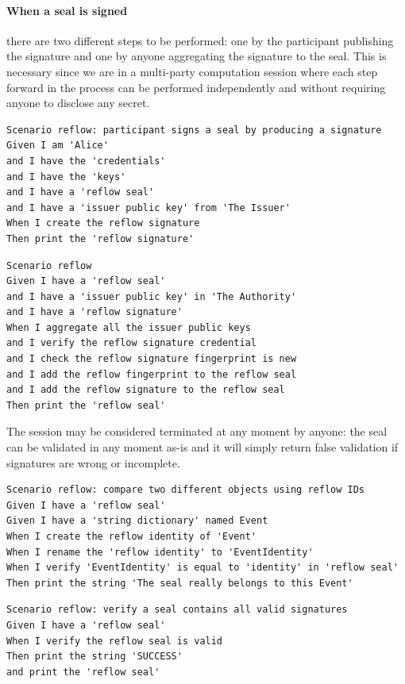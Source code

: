 \documentclass[twocolumn]{article}
\begin{document}
\paragraph{When a seal is signed} there are two different steps to be
performed: one by the participant publishing the signature and one by
anyone aggregating the signature to the seal. This is necessary since
we are in a multi-party computation session where each step forward in
the process can be performed independently and without requiring
anyone to disclose any secret.

\begin{lstlisting}[style=zencode,caption={Create a reflow signature}]
Scenario reflow: participant signs a seal by producing a signature
Given I am 'Alice'
and I have the 'credentials'
and I have the 'keys'
and I have a 'reflow seal'
and I have a 'issuer public key' from 'The Issuer'
When I create the reflow signature
Then print the 'reflow signature'
\end{lstlisting}

\begin{lstlisting}[style=zencode,caption={Add a signature to a seal}]
Scenario reflow
Given I have a 'reflow seal'
and I have a 'issuer public key' in 'The Authority'
and I have a 'reflow signature'
When I aggregate all the issuer public keys
and I verify the reflow signature credential
and I check the reflow signature fingerprint is new
and I add the reflow fingerprint to the reflow seal
and I add the reflow signature to the reflow seal
Then print the 'reflow seal'
\end{lstlisting}

The session may be considered terminated at any moment by anyone: the
seal can be validated in any moment as-is and it will simply return
false validation if signatures are wrong or incomplete.

\begin{lstlisting}[style=zencode,caption={Compare reflow identities}]
Scenario reflow: compare two different objects using reflow IDs
Given I have a 'reflow seal'
Given I have a 'string dictionary' named Event
When I create the reflow identity of 'Event'
When I rename the 'reflow identity' to 'EventIdentity'
When I verify 'EventIdentity' is equal to 'identity' in 'reflow seal'
Then print the string 'The seal really belongs to this Event'
\end{lstlisting}


\begin{lstlisting}[style=zencode,caption={Verify a seal}]
Scenario reflow: verify a seal contains all valid signatures
Given I have a 'reflow seal'
When I verify the reflow seal is valid
Then print the string 'SUCCESS'
and print the 'reflow seal'
\end{lstlisting}
\end{document}
